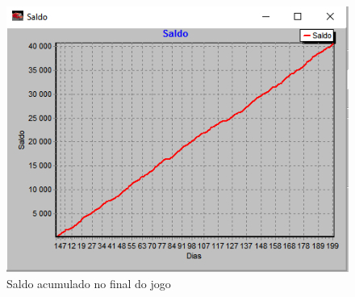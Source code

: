 \begin{figure}[h]
	\centering
	\includegraphics[scale=0.75]{./report/img/saldo.png}
	\caption{Saldo acumulado no final do jogo}
\label{fig:figure1}
\end{figure}

